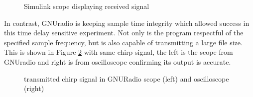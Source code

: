 \documentclass[letterpaper, 12 pt, conference]{report}
\numberwithin{figure}{section}
\begin{document}
\begin{appendices}
\begin{figure}[H]
\centering{}
\caption{Simulink scope displaying received signal}
\label{fig:simurx}
\end{figure}

In contrast, GNUradio is keeping sample time integrity which allowed success in this time delay sensitive experiment. Not only is the program respectful of the specified sample frequency, but is also capable of transmitting a large file size. This is shown in Figure \ref{fig:Gnu2Scopes} with same chirp signal, the left is the scope from GNUradio and right is from oscilloscope confirming its output is accurate.
\begin{figure}[H]
\centering{}
\caption{transmitted chirp signal in GNURadio scope (left) and oscilloscope (right)}
\label{fig:Gnu2Scopes}
\end{figure} 
\end{appendices}


\newpage


\end{document}
